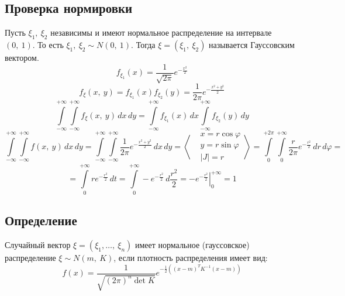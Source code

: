 \documentclass[12pt, a4paper]{article}
\begin{document}
    \subsection*{Проверка нормировки}
    Пусть $\xi_1,\ \xi_2$ независимы и имеют нормальное распределение на интервале $(0,\ 1)$. То есть $\xi_1,\ \xi_2\sim N(0,\ 1)$. Тогда $\xi = (\xi_1,\ \xi_2)$ называется Гауссовским вектором.
    \[f_{\xi_1}(x) = \frac{1}{\sqrt{2\pi}} e^{-\frac{x^2}{2}}\]
    \[f_{\xi}(x,\ y) = f_{\xi_1}(x)f_{\xi_2}(y) = \frac{1}{2\pi} e^{-\frac{x^2 + y^2}{2}}\]
    \[\int\limits_{-\infty}^{+\infty}\int\limits_{-\infty}^{+\infty} f_{\xi}(x,\ y)\, dx\, dy = \int\limits_{-\infty}^{+\infty} f_{\xi_1}(x)\, dx \int\limits_{-\infty}^{+\infty} f_{\xi_2}(y)\, dy\]
    \[\int\limits_{-\infty}^{+\infty}\int\limits_{-\infty}^{+\infty} f(x,\ y)\, dx\, dy = \int\limits_{-\infty}^{+\infty}\int\limits_{-\infty}^{+\infty} \frac{1}{2\pi} e^{-\frac{x^2 + y^2}{2}}\, dx\, dy = \left< \begin{aligned}
        & x = r\cos \varphi\\
        & y = r\sin \varphi\\
        &|J| = r 
    \end{aligned} \right> = \int\limits_{0}^{+2\pi}\int\limits_{0}^{+\infty} \frac{r}{2\pi} e^{-\frac{r^2}{2}}\, dr\, d\varphi = \]
    \[= \int\limits_{0}^{+\infty} re^{-\frac{r^2}{2}}\, dt = \int\limits_{0}^{+\infty} -e^{-\frac{r^2}{2}}\, d\frac{r^2}{2} = \left.-e^{-\frac{r^2}{2}}\right|^{+\infty}_0 = 1\]
    \subsection*{Определение}
    Случайный вектор $\xi = (\xi_1,\dots,\ \xi_n)$ имеет нормальное (гауссовское) распределение $\xi \sim N(m,\ K)$, если плотность распределения имеет вид:
    \[f(x) = \frac{1}{\sqrt{(2\pi)^n \det K}} e^{-\frac{1}{2}\left((x - m)^T K^{-1}(x - m)\right)}\]
\end{document}
